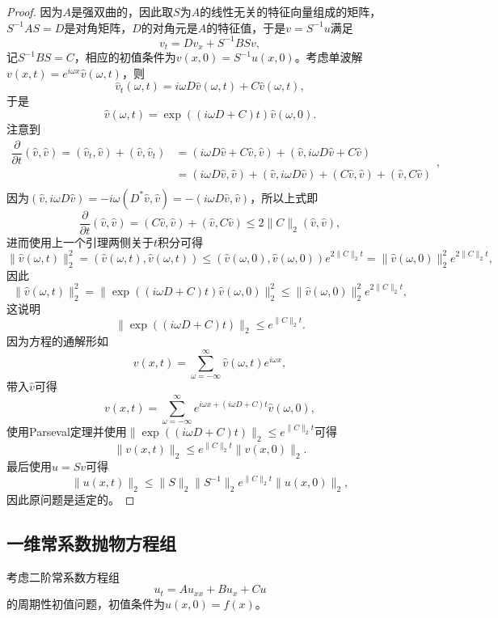 \documentclass[a4paper,10pt]{ctexart}
\begin{document}
\begin{proof}
    因为$ A $是强双曲的，因此取$ S $为$ A $的线性无关的特征向量组成的矩阵，$ S^{-1}AS = D $是对角矩阵，$ D $的对角元是$ A $的特征值，于是$ v = S^{-1}u $满足
    \[
        v_t = Dv_x + S^{-1}BS v,
    \]
    记$ S^{-1}BS = C $，相应的初值条件为$ v(x,0) = S^{-1}u(x,0) $。考虑单波解$ v(x,t) = e^{i \omega x}\hat{v}(\omega,t) $，则
    \[
        \hat{v}_t(\omega,t) = i \omega D\hat{v}(\omega,t) + C\hat{v}(\omega,t),
    \]
    于是
    \[
        \hat{v}(\omega,t) = \exp((i \omega D+C) t)\hat{v}(\omega,0).
    \]
    注意到
    \[
        \begin{aligned}
            \dfrac{\partial }{\partial t} (\hat{v},\hat{v}) = (\hat{v}_t,\hat{v}) + (\hat{v},\hat{v}_t) 
            &= (i \omega D\hat{v} + C\hat{v},\hat{v}) + (\hat{v},i \omega D\hat{v} + C\hat{v}) \\
            &= (i \omega D \hat{v}, \hat{v}) + (\hat{v},i \omega D\hat{v}) + (C\hat{v},\hat{v}) + (\hat{v},C\hat{v}) \\
        \end{aligned},
    \]
    因为$(\hat{v},i \omega D\hat{v}) = -i \omega (D^* \hat{v}, \hat{v}) = -(i \omega D \hat{v}, \hat{v}) $，所以上式即
    \[
        \dfrac{\partial }{\partial t} (\hat{v},\hat{v}) = (C\hat{v},\hat{v}) + (\hat{v},C\hat{v}) \leqslant 2\| C \|_2 (\hat{v},\hat{v}),
    \]
    进而使用上一个引理两侧关于$ t $积分可得
    \[
        \| \hat{v}(\omega,t) \|_2^2 =(\hat{v}(\omega,t),\hat{v}(\omega,t)) \leqslant (\hat{v}(\omega,0),\hat{v}(\omega,0))e^{2\| C \|_2 t} = \| \hat{v}(\omega,0) \|_2^2 e^{2\| C \|_2 t},
    \]
    因此
    \[
        \| \hat{v}(\omega,t) \|_2^2 = \| \exp((i \omega D+C) t)\hat{v}(\omega,0) \|_2^2 \leqslant \| \hat{v}(\omega,0) \|_2^2 e^{2\| C \|_2 t},
    \]
    这说明
    \[
        \| \exp((i \omega D+C) t) \|_2 \leqslant e^{\| C \|_2 t}.
    \]
    因为方程的通解形如
    \[
        v(x,t) = \sum_{\omega = -\infty}^{\infty} \hat{v}(\omega,t)e^{i \omega x},
    \]
    带入$ \hat{v} $可得
    \[
        v(x,t) = \sum_{\omega = -\infty}^{\infty} e^{i \omega x + (i \omega D+C) t}\hat{v}(\omega,0),
    \]
    使用Parseval定理并使用$ \| \exp((i \omega D+C) t) \|_2 \leqslant e^{\| C \|_2 t} $可得
    \[
        \| v(x,t) \|_2 \leqslant e^{\| C \|_2 t} \| v(x,0) \|_2.
    \]
    最后使用$ u = Sv $可得
    \[
        \| u(x,t) \|_2 \leqslant \| S \|_2 \| S^{-1} \|_2  e^{\| C \|_2 t} \| u(x,0) \|_2,
    \]
    因此原问题是适定的。
\end{proof}

\subsection{一维常系数抛物方程组}
考虑二阶常系数方程组
\begin{equation}\label{eq:parabolics}
    u_t = Au_{xx} + Bu_x + Cu
\end{equation}
的周期性初值问题，初值条件为$ u(x,0) = f(x) $。
\end{document}
